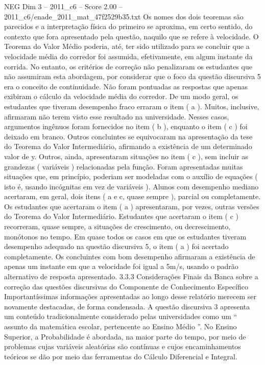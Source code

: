 \begin{textsample}{NEG Dim 3 – 2011\_c6 – Score 2.00 – 2011\_c6/enade\_2011\_mat\_47f2529b35.txt}
Os nomes dos dois teoremas são parecidos e a interpretação física do primeiro se aproxima, em certo sentido, do contexto que fora apresentado pela questão, naquilo que se refere à velocidade.
O Teorema do Valor Médio poderia, até, ter sido utilizado para se concluir que a velocidade média do corredor foi assumida, efetivamente, em algum instante da corrida.
No entanto, os critérios de correção não penalizaram os estudantes que não assumiram esta abordagem, por considerar que o foco da questão discursiva 5 era o conceito de continuidade.
Não foram pontuadas as respostas que apenas exibiram o cálculo da velocidade média do corredor.
De um modo geral, os estudantes que tiveram desempenho fraco erraram o item ( a ).
Muitos, inclusive, afirmaram não terem visto esse resultado na universidade.
Nesses casos, argumentos ingênuos foram fornecidos no item ( b ), enquanto o item ( c ) foi deixado em branco.
Outros concluintes se equivocaram na apresentação da tese do Teorema do Valor Intermediário, afirmando a existência de um determinado valor de y.
Outros, ainda, apresentaram situações no item ( c ), sem incluir as grandezas ( variáveis ) relacionadas pela função.
Foram apresentadas muitas situações que, em princípio, poderiam ser modeladas com o auxílio de equações ( isto é, usando incógnitas em vez de variáveis ).
Alunos com desempenho mediano acertaram, em geral, dois itens ( a e c, quase sempre ), parcial ou completamente.
Os estudantes que acertaram o item ( a ) apresentaram, por vezes, outras versões do Teorema do Valor Intermediário.
Estudantes que acertaram o item ( c ) recorreram, quase sempre, a situações de crescimento, ou decrescimento, monótonos no tempo.
Em quase todos os casos em que os estudantes tiveram desempenho adequado na questão discursiva 5, o item ( a ) foi acertado completamente.
Os concluintes com bom desempenho afirmaram a existência de apenas um instante em que a velocidade foi igual a 5m/s, usando o padrão alternativo de resposta apresentado. 3.3.3 Considerações Finais da Banca sobre a correção das questões discursivas do Componente de Conhecimento Específico Importantíssimas informações apresentadas ao longo desse relatório merecem ser novamente destacadas, de forma condensada.
A questão discursiva 3 apresenta um conteúdo tradicionalmente considerado pelas universidades como um “ assunto da matemática escolar, pertencente ao Ensino Médio ”.
No Ensino Superior, a Probabilidade é abordada, na maior parte do tempo, por meio de problemas cujas variáveis aleatórias são contínuas e cujos encaminhamentos teóricos se dão por meio das ferramentas do Cálculo Diferencial e Integral.

\end{textsample}
